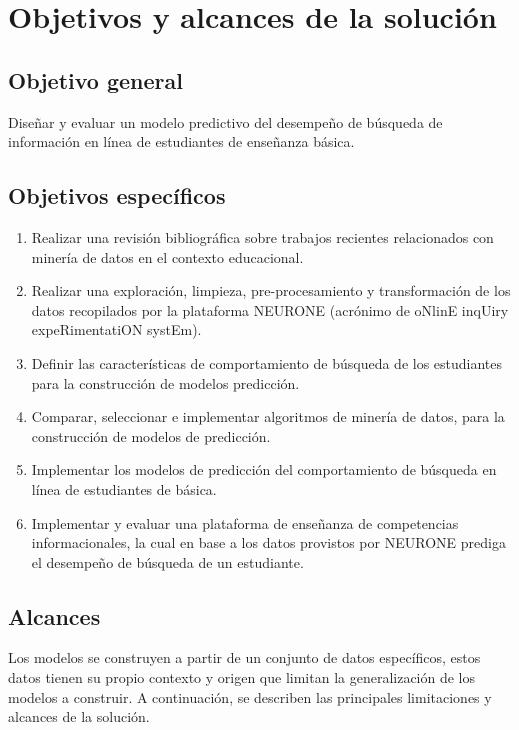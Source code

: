 \section{Objetivos y alcances de la solución}
\label{sec:objetivos}

\subsection{Objetivo general}
\label{subsec:objetivo-general}
Diseñar y evaluar un modelo predictivo del desempeño de búsqueda de información en línea de estudiantes de enseñanza básica.

\subsection{Objetivos específicos}
\label{subsec:objetivo-especificos}

\begin{enumerate}
	\item Realizar una revisión bibliográfica sobre trabajos recientes relacionados con minería de datos en el contexto educacional.
	\item Realizar una exploración, limpieza, pre-procesamiento y transformación de los datos recopilados por la plataforma NEURONE (acrónimo de oNlinE inqUiry expeRimentatiON systEm).
	\item Definir las características de comportamiento de búsqueda de los estudiantes para la construcción de modelos predicción.
	\item Comparar, seleccionar e implementar algoritmos de minería de datos, para la construcción de modelos de predicción.
	\item Implementar los modelos de predicción del comportamiento de búsqueda en línea de estudiantes de básica.
	\item Implementar y evaluar una plataforma de enseñanza de competencias informacionales, la cual en base a los datos provistos por NEURONE prediga el desempeño de búsqueda de un estudiante.
\end{enumerate}

\subsection{Alcances}
\label{subsec:alcances}
Los modelos se construyen a partir de un conjunto de datos específicos, estos datos tienen su propio contexto y origen que limitan la generalización de los modelos a construir. A continuación, se describen las principales limitaciones y alcances de la solución.

